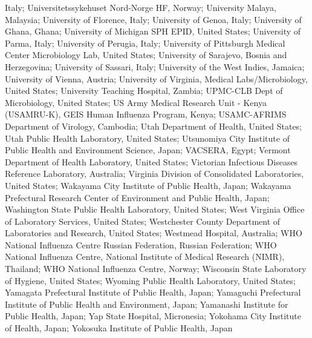 Italy; Universitetssykehuset Nord-Norge HF, Norway; University Malaya, Malaysia; University of Florence, Italy; University of Genoa, Italy; University of Ghana, Ghana; University of Michigan SPH EPID, United States; University of Parma, Italy; University of Perugia, Italy; University of Pittsburgh Medical Center Microbiology Lab, United States; University of Sarajevo, Bosnia and Herzegovina; University of Sassari, Italy; University of the West Indies, Jamaica; University of Vienna, Austria; University of Virginia, Medical Labs/Microbiology, United States; University Teaching Hospital, Zambia; UPMC-CLB Dept of Microbiology, United States; US Army Medical Research Unit - Kenya (USAMRU-K), GEIS Human Influenza Program, Kenya; USAMC-AFRIMS Department of Virology, Cambodia; Utah Department of Health, United States; Utah Public Health Laboratory, United States; Utsunomiya City Institute of Public Health and Environment Science, Japan; VACSERA, Egypt; Vermont Department of Health Laboratory, United States; Victorian Infectious Diseases Reference Laboratory, Australia; Virginia Division of Consolidated Laboratories, United States; Wakayama City Institute of Public Health, Japan; Wakayama Prefectural Research Center of Environment and Public Health, Japan; Washington State Public Health Laboratory, United States; West Virginia Office of Laboratory Services, United States; Westchester County Department of Laboratories and Research, United States; Westmead Hospital, Australia; WHO National Influenza Centre Russian Federation, Russian Federation; WHO National Influenza Centre, National Institute of Medical Research (NIMR), Thailand; WHO National Influenza Centre, Norway; Wisconsin State Laboratory of Hygiene, United States; Wyoming Public Health Laboratory, United States; Yamagata Prefectural Institute of Public Health, Japan; Yamaguchi Prefectural Institute of Public Health and Environment, Japan; Yamanashi Institute for Public Health, Japan; Yap State Hospital, Micronesia; Yokohama City Institute of Health, Japan; Yokosuka Institute of Public Health, Japan
